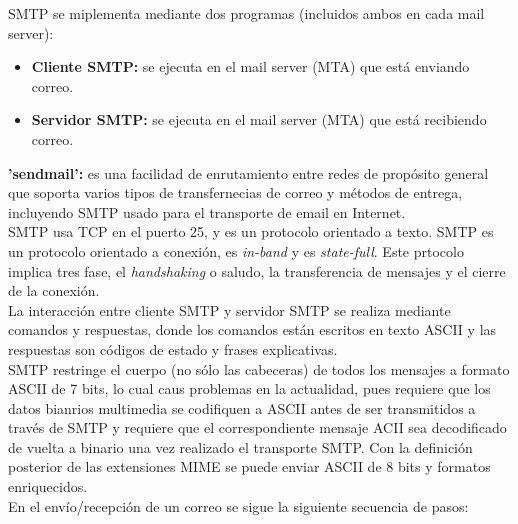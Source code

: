 \documentclass[a4paper,11pt]{article}
\begin{document}
SMTP se miplementa mediante dos programas (incluidos ambos en cada mail server):

\begin{itemize}
\item \textbf{Cliente SMTP:} se ejecuta en el mail server (MTA) que está enviando correo.
\item \textbf{Servidor SMTP:} se ejecuta en el mail server (MTA) que está recibiendo correo.
\end{itemize}

\textbf{'sendmail':} es una facilidad de enrutamiento entre redes de propósito general que soporta varios tipos de transfernecias de correo y métodos de entrega, incluyendo SMTP usado para el transporte de email en Internet. \\

SMTP usa TCP en el puerto 25, y es un protocolo orientado a texto. SMTP es un protocolo orientado a conexión, es \textit{in-band} y es \textit{state-full}. Este prtocolo implica tres fase, el \textit{handshaking} o saludo, la transferencia de mensajes y el cierre de la conexión. \\

La interacción entre cliente SMTP y servidor SMTP se realiza mediante comandos y respuestas, donde los comandos están escritos en texto ASCII y las respuestas son códigos de estado y frases explicativas. \\

SMTP restringe el cuerpo (no sólo las cabeceras) de todos los mensajes a formato ASCII de 7 bits, lo cual caus problemas en la actualidad, pues requiere que los datos bianrios multimedia se codifiquen a ASCII antes de ser transmitidos a través de SMTP y requiere que el correspondiente mensaje ACII sea decodificado de vuelta a binario una vez realizado el transporte SMTP. Con la definición posterior de las extensiones MIME se puede enviar ASCII de 8 bits y formatos enriquecidos. \\

En el envío/recepción de un correo se sigue la siguiente secuencia de pasos:
\end{document}
